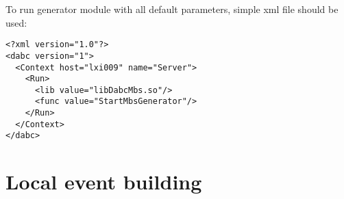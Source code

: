 To run generator module with all default parameters, 
simple xml file should be used:   

\begin{verbatim}
<?xml version="1.0"?>
<dabc version="1">
  <Context host="lxi009" name="Server">
    <Run>
      <lib value="libDabcMbs.so"/>
      <func value="StartMbsGenerator"/>
    </Run>
  </Context>
</dabc>
\end{verbatim}
 

\section{Local event building}
